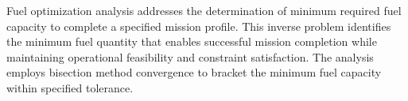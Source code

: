 Fuel optimization analysis addresses the determination of minimum required fuel capacity to complete a specified mission profile. This inverse problem identifies the minimum fuel quantity that enables successful mission completion while maintaining operational feasibility and constraint satisfaction. The analysis employs bisection method convergence to bracket the minimum fuel capacity within specified tolerance.